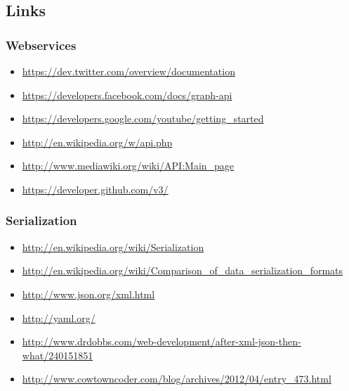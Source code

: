 \subsection*{Links}

\subsubsection*{Webservices} 
\begin{itemize}
\item \url{https://dev.twitter.com/overview/documentation}
\item \url{https://developers.facebook.com/docs/graph-api}
\item \url{https://developers.google.com/youtube/getting_started}
\item \url{http://en.wikipedia.org/w/api.php}
\item \url{http://www.mediawiki.org/wiki/API:Main_page}
\item \url{https://developer.github.com/v3/}
\end{itemize}

\subsubsection*{Serialization}

\begin{itemize}
\item \url{http://en.wikipedia.org/wiki/Serialization}
\item \url{http://en.wikipedia.org/wiki/Comparison_of_data_serialization_formats}
\item \url{http://www.json.org/xml.html}
\item \url{http://yaml.org/}
\item \url{http://www.drdobbs.com/web-development/after-xml-json-then-what/240151851}
\item \url{http://www.cowtowncoder.com/blog/archives/2012/04/entry_473.html}
\end{itemize}

